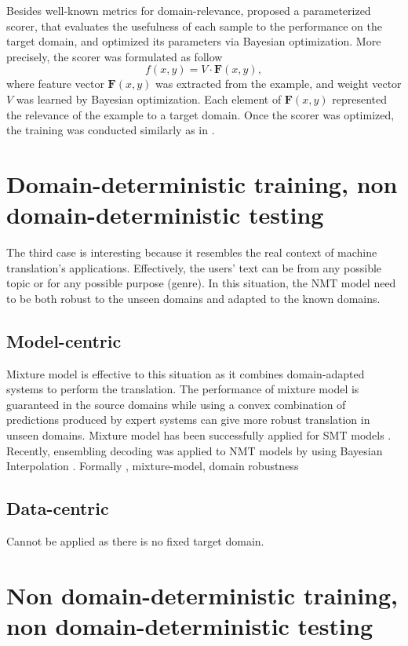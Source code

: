 Besides well-known metrics for domain-relevance, \citet{Zhang19curriculum} proposed a parameterized scorer, that evaluates the usefulness of each sample to the performance on the target domain, and optimized its parameters via Bayesian optimization. More precisely, the scorer was formulated as follow
\begin{equation}
\mathit{f}(x,y) = V \cdot \mathbf{F}(x,y),
\end{equation}
where feature vector $\mathbf{F}(x,y)$ was extracted from the example, and weight vector $V$ was learned by Bayesian optimization. Each element of $\mathbf{F}(x,y)$ represented the relevance of the example to a target domain. Once the scorer was optimized, the training was conducted similarly as in \citet{Wees17dynamic,Wang19dynamically}.
\section{Domain-deterministic training, non domain-deterministic testing}
\label{sec:case3}
The third case is interesting because it resembles the real context of machine translation's applications. Effectively, the users' text can be from any possible topic or for any possible purpose (genre). In this situation, the NMT model need to be both robust to the unseen domains and adapted to the known domains. 
\subsection{Model-centric}
Mixture model is effective to this situation as it combines domain-adapted systems to perform the translation. The performance of mixture model is guaranteed in the source domains while using a convex combination of predictions produced by expert systems can give more robust translation in unseen domains. Mixture model has been successfully applied for SMT models \citep{Sennrich12perplexity, Carpuat14linear, Sennrich12mixture}. Recently, ensembling decoding was applied to NMT models by \citet{Saunders19domain} using Bayesian Interpolation \citep{Allauzen11bayesian}. Formally 
, mixture-model, domain robustness
\cite{Muller20domain}
\subsection{Data-centric}
Cannot be applied as there is no fixed target domain. 
\section{Non domain-deterministic training, non domain-deterministic testing}
\label{sec:case4}
